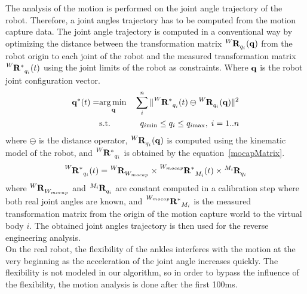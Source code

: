 \documentclass[letterpaper, 10pt, conference]{ieeeconf}      %
\begin{document}
The analysis of the motion is performed on the joint angle trajectory of the robot.
Therefore, a joint angles trajectory has to be computed from the motion capture data.
The joint angle trajectory is computed in a conventional way by optimizing the distance
between the transformation matrix $\tensor[^{W}]{\mathbf{R}}{_{q_i}}(\mbf{q})$ from the 
robot origin to each joint of the robot and the measured
transformation matrix $\tensor[^{W}]{\mathbf{R^*}}{_{q_i}}(t)$ using the joint limits
of the robot as constraints. Where ${\mathbf{q}}$ is the robot joint configuration vector.
\begin{eqnarray}
  \mbf{q}^*(t) =  & \underset{\mbf{q}}\argmin & \sum_i^n \Vert \tensor[^{W}]{\mathbf{R^*}}{_{q_i}}(t) \ominus \tensor[^{W}]{\mathbf{R}}{_{q_i}}(\mbf{q}) \Vert ^2\\
    & \text{s.t.} & q_{i\mathrm{min}} \leq q_i \leq q_{i\mathrm{max}}, \; i = 1..n
  \label{mocapOpti}
\end{eqnarray}
where $\ominus$ is the distance operator, 
$\tensor[^{W}]{\mathbf{R}}{_{q_i}}(\mbf{q})$ is computed using the kinematic
model of the robot, and $\tensor[^{W}]{\mathbf{R^*}}{_{q_i}}$ is obtained by
the equation~\ref{mocapMatrix}.
\begin{equation}
\tensor[^{W}]{\mathbf{R^*}}{_{q_i}}(t) = \tensor[^{W}]{\mathbf{R}}{_{W_{mocap}}} \times \tensor[^{W_{mocap}}]{\mathbf{R^*}}{_{M_i}}(t) \times \tensor[^{M_i}]{\mathbf{R}}{_{q_i}}    
  \label{mocapMatrix}
\end{equation}
where $\tensor[^{W}]{\mathbf{R}}{_{W_{mocap}}}$ and $\tensor[^{M_i}]{\mathbf{R}}{_{q_i}}$ are constant
computed in a calibration step where both real joint angles
are known, and $\tensor[^{W_{mocap}}]{\mathbf{R^*}}{_{M_i}}$
is the measured transformation matrix from the origin of the motion capture world
to the virtual body $i$. The obtained joint angles trajectory is then used for the reverse engineering analysis.\\

On the real robot, the flexibility of the ankles interferes with the motion at the very beginning as the acceleration
of the joint angle increases quickly. The flexibility is not modeled in our algorithm, so
in order to bypass the influence of the flexibility, the motion analysis is done after the first 100ms.
\end{document}
